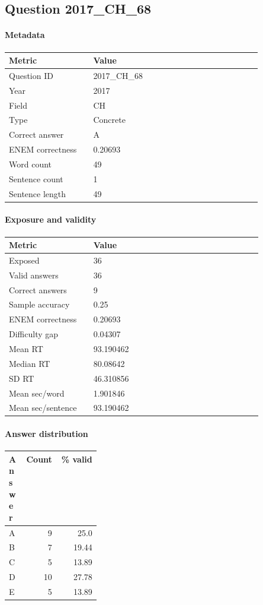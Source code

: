 \subsection*{Question 2017\_CH\_68}
\label{sec:q_2017_CH_68}
\paragraph{Metadata}
\begin{tabular}{p{0.30\linewidth}p{0.60\linewidth}}
\toprule
Metric & Value\\
\midrule
Question ID & 2017\_CH\_68\\
Year & 2017\\
Field & CH\\
Type & Concrete\\
Correct answer & A\\
ENEM correctness & 0.20693\\
Word count & 49\\
Sentence count & 1\\
Sentence length & 49\\
\bottomrule
\end{tabular}

\paragraph{Exposure and validity}
\begin{tabular}{p{0.30\linewidth}p{0.60\linewidth}}
\toprule
Metric & Value\\
\midrule
Exposed & 36\\
Valid answers & 36\\
Correct answers & 9\\
Sample accuracy & 0.25\\
ENEM correctness & 0.20693\\
Difficulty gap & 0.04307\\
Mean RT & 93.190462\\
Median RT & 80.08642\\
SD RT & 46.310856\\
Mean sec/word & 1.901846\\
Mean sec/sentence & 93.190462\\
\bottomrule
\end{tabular}

\paragraph{Answer distribution}
\begin{tabular}{p{0.18\linewidth}rr}
\toprule
Answer & Count & \% valid\\
\midrule
A & 9 & 25.0\\
B & 7 & 19.44\\
C & 5 & 13.89\\
D & 10 & 27.78\\
E & 5 & 13.89\\
\bottomrule
\end{tabular}

